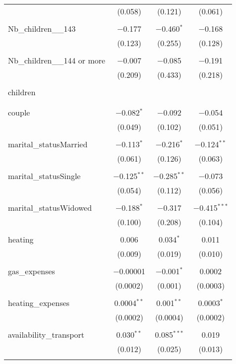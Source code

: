 \begin{tabular}{@{\extracolsep{5pt}}lccc}
  & (0.058) & (0.121) & (0.061) \\ 
  & & & \\ 
 Nb\_children\_\_143 & $-$0.177 & $-$0.460$^{*}$ & $-$0.168 \\ 
  & (0.123) & (0.255) & (0.128) \\ 
  & & & \\ 
 Nb\_children\_\_144 or more & $-$0.007 & $-$0.085 & $-$0.191 \\ 
  & (0.209) & (0.433) & (0.218) \\ 
  & & & \\ 
 children &  &  &  \\ 
  &  &  &  \\ 
  & & & \\ 
 couple & $-$0.082$^{*}$ & $-$0.092 & $-$0.054 \\ 
  & (0.049) & (0.102) & (0.051) \\ 
  & & & \\ 
 marital\_statusMarried & $-$0.113$^{*}$ & $-$0.216$^{*}$ & $-$0.124$^{**}$ \\ 
  & (0.061) & (0.126) & (0.063) \\ 
  & & & \\ 
 marital\_statusSingle & $-$0.125$^{**}$ & $-$0.285$^{**}$ & $-$0.073 \\ 
  & (0.054) & (0.112) & (0.056) \\ 
  & & & \\ 
 marital\_statusWidowed & $-$0.188$^{*}$ & $-$0.317 & $-$0.415$^{***}$ \\ 
  & (0.100) & (0.208) & (0.104) \\ 
  & & & \\ 
 heating & 0.006 & 0.034$^{*}$ & 0.011 \\ 
  & (0.009) & (0.019) & (0.010) \\ 
  & & & \\ 
 gas\_expenses & $-$0.00001 & $-$0.001$^{*}$ & 0.0002 \\ 
  & (0.0002) & (0.001) & (0.0003) \\ 
  & & & \\ 
 heating\_expenses & 0.0004$^{**}$ & 0.001$^{**}$ & 0.0003$^{*}$ \\ 
  & (0.0002) & (0.0004) & (0.0002) \\ 
  & & & \\ 
 availability\_transport & 0.030$^{**}$ & 0.085$^{***}$ & 0.019 \\ 
  & (0.012) & (0.025) & (0.013) \\ 
  & & & \\ 

\end{tabular}
